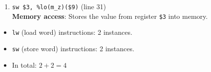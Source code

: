 \begin{itemize}
\begin{enumerate}
    \item \texttt{sw \$3, \%lo(m\_z)(\$9)} (line 31) \\
    \textbf{Memory access}: Stores the value from register \texttt{\$3} into memory.
\end{enumerate}

\begin{itemize}
    \item \texttt{lw} (load word) instructions: 2 instances.
    \item \texttt{sw} (store word) instructions: 2 instances.
    \item In total: $2 + 2 = \boxed{4}$
\end{itemize}

\end{itemize}